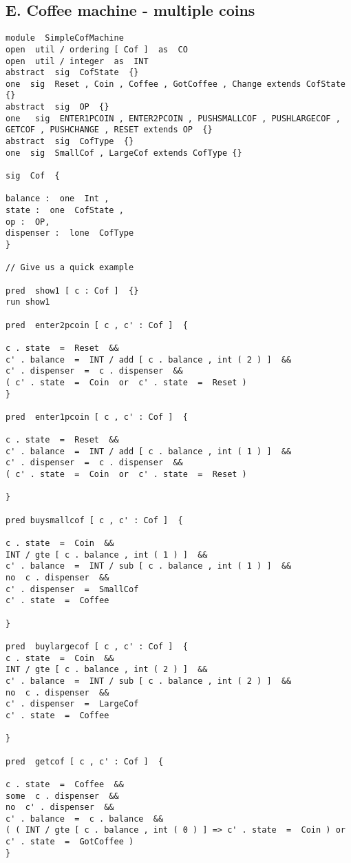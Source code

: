 \documentclass[a4paper,12pt]{extarticle}
\begin{document}
\subsection{E. Coffee machine - multiple coins}
\begin{verbatim}
module  SimpleCofMachine
open  util / ordering [ Cof ]  as  CO
open  util / integer  as  INT
abstract  sig  CofState  {}
one  sig  Reset , Coin , Coffee , GotCoffee , Change extends CofState {}
abstract  sig  OP  {}
one   sig  ENTER1PCOIN , ENTER2PCOIN , PUSHSMALLCOF , PUSHLARGECOF ,
GETCOF , PUSHCHANGE , RESET extends OP  {}
abstract  sig  CofType  {}
one  sig  SmallCof , LargeCof extends CofType {}

sig  Cof  {

balance :  one  Int ,
state :  one  CofState ,
op :  OP,
dispenser :  lone  CofType
}

// Give us a quick example

pred  show1 [ c : Cof ]  {}
run show1

pred  enter2pcoin [ c , c' : Cof ]  {

c . state  =  Reset  &&
c' . balance  =  INT / add [ c . balance , int ( 2 ) ]  &&
c' . dispenser  =  c . dispenser  &&
( c' . state  =  Coin  or  c' . state  =  Reset )
}

pred  enter1pcoin [ c , c' : Cof ]  {

c . state  =  Reset  &&
c' . balance  =  INT / add [ c . balance , int ( 1 ) ]  &&
c' . dispenser  =  c . dispenser  &&
( c' . state  =  Coin  or  c' . state  =  Reset )

}

pred buysmallcof [ c , c' : Cof ]  {

c . state  =  Coin  &&
INT / gte [ c . balance , int ( 1 ) ]  &&
c' . balance  =  INT / sub [ c . balance , int ( 1 ) ]  &&
no  c . dispenser  &&
c' . dispenser  =  SmallCof
c' . state  =  Coffee

}

pred  buylargecof [ c , c' : Cof ]  {
c . state  =  Coin  &&
INT / gte [ c . balance , int ( 2 ) ]  &&
c' . balance  =  INT / sub [ c . balance , int ( 2 ) ]  &&
no  c . dispenser  &&
c' . dispenser  =  LargeCof
c' . state  =  Coffee

}

pred  getcof [ c , c' : Cof ]  {

c . state  =  Coffee  &&
some  c . dispenser  &&
no  c' . dispenser  &&
c' . balance  =  c . balance  &&
( ( INT / gte [ c . balance , int ( 0 ) ] => c' . state  =  Coin ) or c' . state  =  GotCoffee )
}


\end{verbatim}
\end{document}
